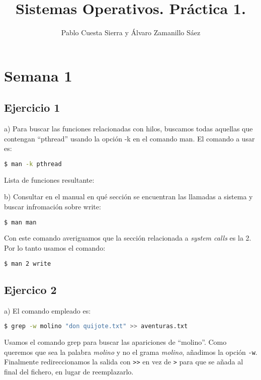 \documentclass{article}
\title{Sistemas Operativos. Práctica 1.}
\author{Pablo Cuesta Sierra y Álvaro Zamanillo Sáez }
\date{}
\begin{document}
\maketitle


\section*{Semana 1}
\subsection*{Ejercicio 1}

a) Para buscar las funciones relacionadas con hilos, buscamos todas aquellas que contengan ``pthread'' usando la opción -k en el comando man. El comando a usar es: 

\begin{lstlisting}[language=bash]
$ man -k pthread
\end{lstlisting}

Lista de funciones resultante: 



b) Consultar en el manual en qué sección se encuentran las llamadas a sistema y buscar infromación sobre write:

\begin{lstlisting}[language=bash]
$ man man
\end{lstlisting}

Con este comando averiguamos que la sección relacionada a \textit{system calls} es la 2. Por lo tanto usamos el comando:

\begin{lstlisting}[language=bash]
$ man 2 write
\end{lstlisting}

\subsection*{Ejercico 2}


a) El comando empleado es: 

\begin{lstlisting}[language=bash]
$ grep -w molino "don quijote.txt" >> aventuras.txt
\end{lstlisting}

Usamos el comando grep para buscar las apariciones de ``molino''. Como queremos que sea la palabra \textit{molino} y no el grama \textit{molino}, añadimos la opción \texttt{-w}. Finalmente redireccionamos la salida con \texttt {>}\texttt {>} en vez de \texttt {>} para que se añada al final del fichero, en lugar de reemplazarlo.
\end{document}
